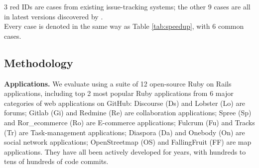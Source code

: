 \begin{table*}[th]
\centering
\caption{Database sizes and page load time of 12 user-study cases}
\label{tab:dbsize}	

\footnotesize{3 red IDs are cases from existing issue-tracking systems; the other 9 cases are all in latest versions discovered by \Tool.\\ Every case is denoted in the same way as Table \ref{tab:speedup}, with 6 common cases.} 
 \vspace{-0.2in}
\end{table*}
\subsection{Methodology}
{\bf Applications.}
We evaluate \Tool using a suite of 12 open-source Ruby on Rails applications, including top 2
most popular Ruby applications from 6 major categories of web applications on GitHub: 
Discourse (Ds) and Lobster (Lo) are forums;
Gitlab (Gi) and Redmine (Re) are collaboration applications;
Spree (Sp) and Ror\_ecommerce (Ro) are E-commerce applications;
Fulcrum (Fu) and Tracks (Tr) are Task-management applications;
Diaspora (Da) and Onebody (On) are social network applications;
OpenStreetmap (OS) and FallingFruit (FF) are map applications.
They have all been actively developed for years, with
hundreds to tens of hundreds of code commits.

